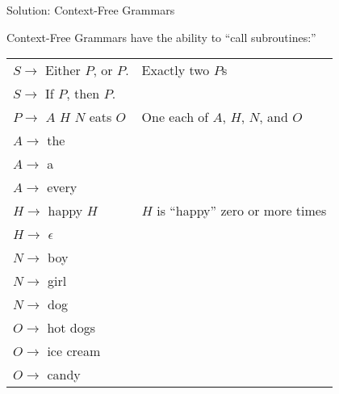 \documentclass{plt}
\begin{document}
\begin{frame}{Solution: Context-Free Grammars}

Context-Free Grammars have the ability to ``call subroutines:''

{\ttfamily
\begin{tabular}{ll}
$S \rightarrow$ Either $P$, or $P$. & \rmfamily \alert{Exactly two $P$s}\\
$S \rightarrow$ If $P$, then $P$. \\
$P \rightarrow$ $A$ $H$ $N$ eats $O$ & \rmfamily \alert{One each of $A$, $H$, $N$, and
    $O$} \\
$A \rightarrow$ the \\
$A \rightarrow$ a \\
$A \rightarrow$ every \\
$H \rightarrow$ happy $H$ & \rmfamily \alert{$H$ is ``happy'' zero or more times} \\
$H \rightarrow$ $\epsilon$ \\
$N \rightarrow$ boy \\
$N \rightarrow$ girl \\
$N \rightarrow$ dog \\
$O \rightarrow$ hot dogs \\
$O \rightarrow$ ice cream \\
$O \rightarrow$ candy \\
\end{tabular}
}

\end{frame}
\end{document}
